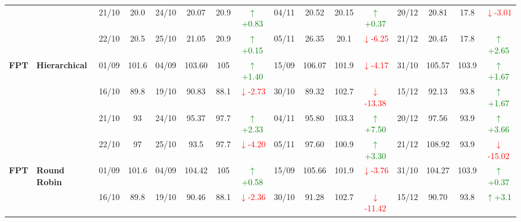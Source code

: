 \documentclass{ieeeaccess}
\begin{document}
{\begin{longtable}{llcc|cccc|cccc|cccc}
&
& 21/10 & 20.0 & 24/10 & 20.07 & 20.9 & \textcolor{green}{\(\uparrow\)+0.83} & 04/11 & 20.52 & 20.15 & \textcolor{green}{\(\uparrow\)+0.37} & 20/12 & 20.81 & 17.8 & \textcolor{red}{\(\downarrow\)-3.01} \\

&
& 22/10 & 20.5 & 25/10 & 21.05 & 20.9 & \textcolor{green}{\(\uparrow\)+0.15} & 05/11 & 26.35 & 20.1 & \textcolor{red}{\(\downarrow\)-6.25} & 21/12 & 20.45 & 17.8 & \textcolor{green}{\(\uparrow\)+2.65} \\
\midrule



\multirow{4}{*}{\textbf{FPT}} 
& \textbf{Hierarchical}
& 01/09 & 101.6 & 04/09 & 103.60 & 105 & \textcolor{green}{\(\uparrow\)+1.40} & 15/09 & 106.07 & 101.9 & \textcolor{red}{\(\downarrow\)-4.17} & 31/10 & 105.57 & 103.9 & \textcolor{green}{\(\uparrow\)+1.67} \\

&
& 16/10 & 89.8 & 19/10 & 90.83 & 88.1 & \textcolor{red}{\(\downarrow\)-2.73} & 30/10 & 89.32 & 102.7 & \textcolor{red}{\(\downarrow\)-13.38} & 15/12 & 92.13 & 93.8 & \textcolor{green}{\(\uparrow\)+1.67} \\

&
& 21/10 & 93 & 24/10 & 95.37 & 97.7 & \textcolor{green}{\(\uparrow\)+2.33} & 04/11 & 95.80 & 103.3 & \textcolor{green}{\(\uparrow\)+7.50} & 20/12 & 97.56 & 93.9 &\textcolor{green}{\(\uparrow\)+3.66}\\

&
& 22/10 & 97 & 25/10 & 93.5 & 97.7 & \textcolor{red}{\(\downarrow\)-4.20} & 05/11 & 97.60 & 100.9 & \textcolor{green}{\(\uparrow\)+3.30} & 21/12 & 108.92 & 93.9 & \textcolor{red}{\(\downarrow\)-15.02} \\
\midrule


\multirow{4}{*}{\textbf{FPT}} 
& \textbf{Round Robin}
& 01/09 & 101.6 & 04/09 & 104.42 & 105 & \textcolor{green}{\(\uparrow\)+0.58} & 15/09 & 105.66 & 101.9 & \textcolor{red}{\(\downarrow\)-3.76} & 31/10 & 104.27 & 103.9 & \textcolor{green}{\(\uparrow\)+0.37} \\

&
& 16/10 & 89.8 & 19/10 & 90.46 & 88.1 & \textcolor{red}{\(\downarrow\)-2.36} & 30/10 & 91.28 & 102.7 & \textcolor{red}{\(\downarrow\)-11.42} & 15/12 & 90.70 & 93.8 & \textcolor{green}{\(\uparrow\)+3.1} \\


\end{longtable}}
\end{document}
